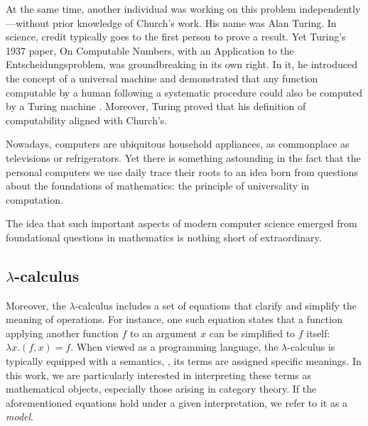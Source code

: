  At the same time, another individual was working on this problem independently—without prior knowledge of Church’s work. His name was Alan Turing. In science, credit typically goes to the first person to prove a result. Yet Turing’s 1937 paper, On Computable Numbers, with an Application to the Entscheidungsproblem, was groundbreaking in its own right. In it, he introduced the concept of a universal machine and demonstrated that any function computable by a human following a systematic procedure could also be computed by a Turing machine \cite{turingComputableNumbersApplication1937}. Moreover, Turing proved that his definition of computability aligned with Church’s.


Nowadays, computers are ubiquitous household appliances, as commonplace as televisions or refrigerators. Yet there is  something astounding in the fact that the personal computers we use daily trace their roots to an idea born from questions about the foundations of mathematics: the principle of universality in computation. 

The idea that such important aspects of modern computer science emerged from foundational questions in mathematics is nothing short of extraordinary.




\subsection*{ $\lambda$-calculus}



Moreover, the $\lambda$-calculus includes a set of equations that clarify and simplify the meaning of operations. For instance, one such equation states that a function applying another function $f$ to an argument $x$ can be simplified to $f$ itself: $\lambda x.(f, x) = f$. When viewed as a programming language, the $\lambda$-calculus is typically equipped with a  semantics, \ie, its terms are assigned specific meanings. In this work, we are particularly interested in interpreting these terms as mathematical objects, especially those arising in category theory. If the aforementioned equations hold under a given interpretation, we refer to it as a \emph{model}.

